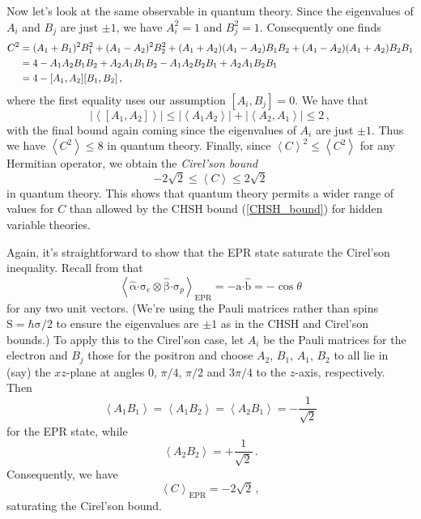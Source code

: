 \documentclass{article}
\theoremstyle{plain}\theoremheaderfont{\normalfont\itshape}\theorembodyfont{\rmfamily}\theoremseparator{.}\newtheorem*{rem}{Remark}\newtheorem*{ex}{Example}\newtheorem*{proof}{Proof}\newtheorem*{altp}{Alternative proof}
\theoremstyle{plain}\theoremheaderfont{\normalfont\bfseries}\theorembodyfont{\rmfamily}\theoremseparator{.}\newtheorem{thm}{Theorem}[section]\newtheorem{lem}[thm]{Lemma}\newtheorem{prop}[thm]{Proposition}\newtheorem*{cor}{Corollary}\newtheorem{defn}[thm]{Definition}\newtheorem{clm}[thm]{Claim}\newtheorem{clminproof}{Claim}
\theoremstyle{break}\theoremheaderfont{\normalfont\itshape}\theorembodyfont{\rmfamily}\theoremseparator{.\medskip}\newtheorem*{proofskip}{Proof}\newtheorem*{exs}{Examples}\newtheorem*{rems}{Remarks}
\theoremstyle{break}\theoremheaderfont{\normalfont\bfseries}\theorembodyfont{\rmfamily}\theoremseparator{.\medskip}\newtheorem{lemskip}[thm]{Lemma}\newtheorem{defnskip}[thm]{Definition}\newtheorem{propskip}[thm]{Proposition}\newtheorem{thmskip}[thm]{Theorem}
\numberwithin{equation}{section}
\newcommand{\eval}[1]{\left\langle #1 \right\rangle}
\newcommand{\vb}[1]{\bm{\mathrm{#1}}}
\newcommand{\vu}[1]{\hat{\bm{\mathrm{#1}}}}
\newcommand{\vdot}{\bm{\cdot}}
\newcommand{\abs}[1]{\left| #1 \right|}
\begin{document}
    Now let's look at the same observable in quantum theory. Since the eigenvalues of \(A_i\) and \(B_j\) are just \(\pm 1\), we have \(A_i^2=1\) and \(B_j^2=1\). Consequently one finds
    \begin{align}
        C^2&=(A_1+B_1)^2B_1^2+(A_1-A_2)^2B_2^2+(A_1+A_2)(A_1-A_2)B_1B_2+(A_1-A_2)(A_1+A_2)B_2B_1\notag\\
        &=4-A_1A_2B_1B_2+A_2A_1B_1B_2-A_1A_2B_2B_1+A_2A_1B_2B_1\notag\\
        &=4-[A_1,A_2][B_1,B_2]\,,
    \end{align}
    where the first equality uses our assumption \([A_i,B_j]=0\). We have that
    \begin{equation}
        \abs{\eval{[A_1,A_2]}}\le\abs{\eval{A_1A_2}}+\abs{\eval{A_2,A_1}}\le 2\,,
    \end{equation}
    with the final bound again coming since the eigenvalues of \(A_i\) are just \(\pm 1\). Thus we have \(\eval{C^2}\le 8\) in quantum theory. Finally, since \(\eval{C}^2\le\eval{C^2}\) for any Hermitian operator, we obtain the \textit{Cirel'son bound}
    \begin{equation}
        -2\sqrt{2}\le\eval{C}\le 2\sqrt{2}
    \end{equation}
    in quantum theory. This shows that quantum theory permits a wider range of values for \(C\) than allowed by the CHSH bound (\ref{CHSH_bound}) for hidden variable theories.

    Again, it's straightforward to show that the EPR state saturate the Cirel'son inequality. Recall from that
    \begin{equation}
        \eval{\vu{\alpha}\vdot\vb{\sigma}_e\otimes\vu{\beta}\vdot\vb{\sigma}_p}_{\text{EPR}}=-\vu{a}\vdot\vu{b}=-\cos\theta
    \end{equation}
    for any two unit vectors. (We're using the Pauli matrices rather than spins \(\vb{S}=\hbar\vb{\sigma}/2\) to ensure the eigenvalues are \(\pm 1\) as in the CHSH and Cirel'son bounds.) To apply this to the Cirel'son case, let \(A_i\) be the Pauli matrices for the electron and \(B_j\) those for the positron and choose \(A_2\), \(B_1\), \(A_1\), \(B_2\) to all lie in (say) the \(xz\)-plane at angles \(0\), \(\pi/4\), \(\pi/2\) and \(3\pi/4\) to the \(z\)-axis, respectively. Then
    \begin{equation}
        \eval{A_1B_1}=\eval{A_1B_2}=\eval{A_2B_1}=-\frac{1}{\sqrt{2}}
    \end{equation}
    for the EPR state, while
    \begin{equation}
        \eval{A_2B_2}=+\frac{1}{\sqrt{2}}\,.
    \end{equation}
    Consequently, we have
    \begin{equation}
        \eval{C}_{\text{EPR}}=-2\sqrt{2}\,,
    \end{equation}
    saturating the Cirel'son bound.
\end{document}
